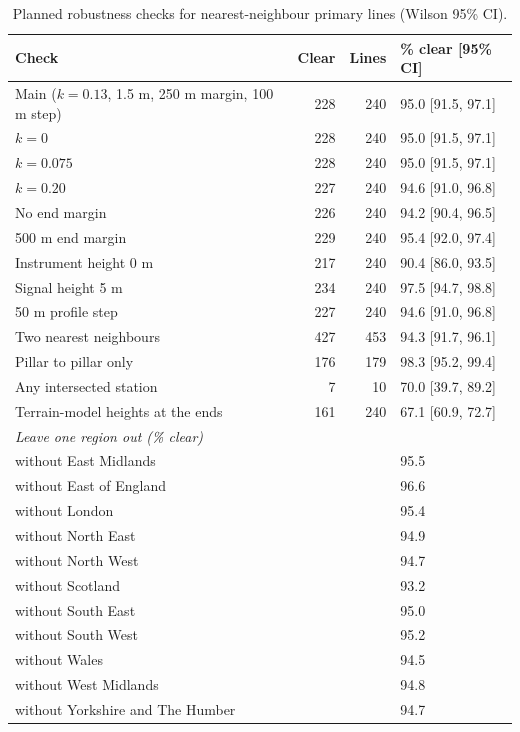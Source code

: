 \documentclass[11pt,a4paper]{article}
\begin{document}
\begin{table}[tbp]\centering\small\caption{Planned robustness checks for nearest-neighbour primary lines (Wilson 95\% CI).}\label{tab:robust}\begin{tabular}{lrrl}\toprule Check & Clear & Lines & \% clear [95\% CI]\\\midrule
Main ($k = 0.13$, 1.5 m, 250 m margin, 100 m step) & 228 & 240 & 95.0 [91.5, 97.1]\\
$k = 0$ & 228 & 240 & 95.0 [91.5, 97.1]\\
$k = 0.075$ & 228 & 240 & 95.0 [91.5, 97.1]\\
$k = 0.20$ & 227 & 240 & 94.6 [91.0, 96.8]\\
No end margin & 226 & 240 & 94.2 [90.4, 96.5]\\
500 m end margin & 229 & 240 & 95.4 [92.0, 97.4]\\
Instrument height 0 m & 217 & 240 & 90.4 [86.0, 93.5]\\
Signal height 5 m & 234 & 240 & 97.5 [94.7, 98.8]\\
50 m profile step & 227 & 240 & 94.6 [91.0, 96.8]\\
Two nearest neighbours & 427 & 453 & 94.3 [91.7, 96.1]\\
Pillar to pillar only & 176 & 179 & 98.3 [95.2, 99.4]\\
Any intersected station & 7 & 10 & 70.0 [39.7, 89.2]\\
Terrain-model heights at the ends & 161 & 240 & 67.1 [60.9, 72.7]\\
\midrule\multicolumn{4}{l}{\textit{Leave one region out (\% clear)}}\\
\quad without East Midlands & & & 95.5\\
\quad without East of England & & & 96.6\\
\quad without London & & & 95.4\\
\quad without North East & & & 94.9\\
\quad without North West & & & 94.7\\
\quad without Scotland & & & 93.2\\
\quad without South East & & & 95.0\\
\quad without South West & & & 95.2\\
\quad without Wales & & & 94.5\\
\quad without West Midlands & & & 94.8\\
\quad without Yorkshire and The Humber & & & 94.7\\
\bottomrule\end{tabular}\end{table}
\end{document}
